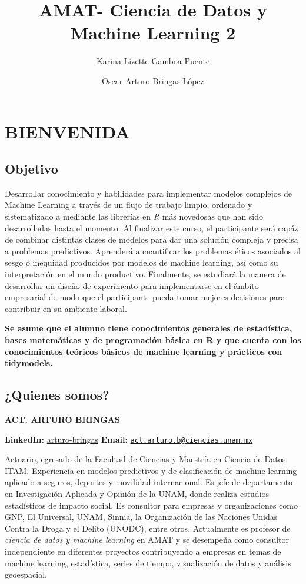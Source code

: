 \documentclass[
]{book}
\title{AMAT- Ciencia de Datos y Machine Learning 2}
\author{Karina Lizette Gamboa Puente \and Oscar Arturo Bringas López}
\date{}
\begin{document}
\maketitle

{
\setcounter{tocdepth}{1}
\tableofcontents
}
\hypertarget{bienvenida}{%
\chapter{BIENVENIDA}\label{bienvenida}}

\hypertarget{objetivo}{%
\section{Objetivo}\label{objetivo}}

Desarrollar conocimiento y habilidades para implementar modelos complejos de Machine Learning a través de un flujo de trabajo limpio, ordenado y sistematizado a mediante las librerías en \emph{R} más novedosas que han sido desarrolladas hasta el momento. Al finalizar este curso, el participante será capáz de combinar distintas clases de modelos para dar una solución compleja y precisa a problemas predictivos. Aprenderá a cuantificar los problemas éticos asociados al sesgo o inequidad producidos por modelos de machine learning, así como su interpretación en el mundo productivo. Finalmente, se estudiará la manera de desarrollar un diseño de experimento para implementarse en el ámbito empresarial de modo que el participante pueda tomar mejores decisiones para contribuir en su ambiente laboral.

\textbf{Se asume que el alumno tiene conocimientos generales de estadística, bases matemáticas y de programación básica en R y que cuenta con los conocimientos teóricos básicos de machine learning y prácticos con tidymodels.}

\hypertarget{quienes-somos}{%
\section{¿Quienes somos?}\label{quienes-somos}}

\textbf{ACT. ARTURO BRINGAS}

\textbf{LinkedIn:} \href{https://www.linkedin.com/in/arturo-bringas/}{arturo-bringas}
\textbf{Email:} \href{mailto:act.arturo.b@ciencias.unam.mx}{\nolinkurl{act.arturo.b@ciencias.unam.mx}}

Actuario, egresado de la Facultad de Ciencias y Maestría en Ciencia de Datos, ITAM.
Experiencia en modelos predictivos y de clasificación de machine learning aplicado a seguros, deportes y movilidad internacional. Es jefe de departamento en Investigación Aplicada y Opinión de la UNAM, donde realiza estudios estadísticos de impacto social. Es consultor para empresas y organizaciones como GNP, El Universal, UNAM, Sinnia, la Organización de las Naciones Unidas Contra la Droga y el Delito (UNODC), entre otros. Actualmente es profesor de \emph{ciencia de datos y machine learning} en AMAT y se desempeña como consultor independiente en diferentes proyectos contribuyendo a empresas en temas de machine learning, estadística, series de tiempo, visualización de datos y análisis geoespacial.
\end{document}
